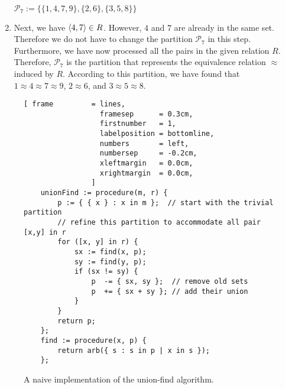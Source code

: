 \begin{enumerate}
      \\[0.2cm]
      \hspace*{1.3cm}
      $\mathcal{P}_7 := \bigl\{ \{1, 4, 7, 9\}, \{2,6\}, \{3,5,8\} \bigr\}$
\item Next, we have $\pair(4,7) \in R$.  However, $4$ and $7$ are already in the same set.
      Therefore we do not have to change the partition $\mathcal{P}_7$ in this step.
      Furthermore, we have now processed all the pairs in the given relation $R$.
      Therefore, $\mathcal{P}_7$ is the partition that represents the equivalence relation $\approx$ induced
      by $R$.  According to this partition, we have found that
      \\[0.2cm]
      \hspace*{1.3cm}
      $1 \approx 4 \approx 7 \approx 9$, \quad $2 \approx 6$,  \quad and \quad $3 \approx 5 \approx 8$.
\end{enumerate}
 

\begin{figure}[!ht]
\centering
\begin{Verbatim}[ frame         = lines, 
                  framesep      = 0.3cm, 
                  firstnumber   = 1,
                  labelposition = bottomline,
                  numbers       = left,
                  numbersep     = -0.2cm,
                  xleftmargin   = 0.0cm,
                  xrightmargin  = 0.0cm,
                ]
    unionFind := procedure(m, r) {
        p := { { x } : x in m };  // start with the trivial partition
        // refine this partition to accommodate all pair [x,y] in r
        for ([x, y] in r) {
            sx := find(x, p);
            sy := find(y, p);
            if (sx != sy) {
                p  -= { sx, sy };  // remove old sets
                p  += { sx + sy }; // add their union
            }
        }
        return p;
    };
    find := procedure(x, p) {
        return arb({ s : s in p | x in s });  
    };
\end{Verbatim}
\vspace*{-0.3cm}
\caption{A naive implementation of the union-find algorithm.}
\label{fig:union-find-naive.stlx}
\end{figure}

